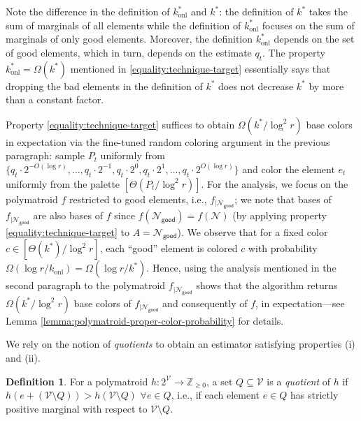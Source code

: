 \documentclass[11pt]{article}
\theoremstyle{definition}
\newtheorem{definition}{Definition}
\newcommand{\calN}{{\mathcal{N}}}
\newcommand{\good}{\mathsf{good}}
\begin{document}
Note the difference in the definition of $k_\text{onl}^*$ and $k^*$: the definition of $k^*$ takes the sum of marginals of all elements while the definition of $k_\text{onl}^*$ focuses on the sum of marginals of only good elements. Moreover, the definition $k_\text{onl}^*$ depends on the set of good elements, which in turn, depends on the estimate $q_t$. 
The property $k_\text{onl}^*=\Omega(k^*)$ mentioned in \eqref{equality:technique-target} essentially says that dropping the bad elements in the definition of $k^*$ does not decrease $k^*$ by more than a constant factor. 
\iffalse
One consequence of property \ref{equality:technique-target} is that (apply the property for $A=\calN_{\good}$)
\begin{align}
    f(\calN_{\good})=f(\calN). 
\end{align} 
\fi
Property \eqref{equality:technique-target} suffices to obtain $\Omega(k^*/\log^2{r})$ base colors in expectation via the fine-tuned random coloring argument in the previous paragraph: sample $P_t$ uniformly from $\{q_t\cdot 2^{-O(\log r)}, \ldots, q_t\cdot 2^{-1}, q_t\cdot 2^0, q_t\cdot 2^{1}, \ldots, q_t\cdot 2^{O(\log r)}\}$ and color the element $e_t$ uniformly from the palette $[\Theta(P_t/\log^2 r)]$. 
For the analysis, we focus on the polymatroid $f$ restricted to good elements, i.e., $f_{|\calN_{\good}}$; we note that bases of $f_{|\calN_{\good}}$ are also bases of $f$ since $f(\calN_{\good})=f(\calN)$ (by applying property \eqref{equality:technique-target} to $A=\calN_{\good}$). 
We observe that for a fixed color $c\in [\Theta(k^*)/\log^2{r}]$, each ``good'' element is colored $c$ with probability $\Omega(\log{r}/k_\text{onl})=\Omega(\log{r}/k^*)$. Hence, using the analysis mentioned in the second paragraph to the polymatroid $f_{|\calN_{\good}}$ shows that the algorithm returns $\Omega(k^*/\log^2{r})$ base colors of $f_{|\calN_{\good}}$ and consequently of $f$, in expectation---see Lemma \ref{lemma:polymatroid-proper-color-probability} for details. 
\fi

We rely on the notion of \emph{quotients} to obtain an estimator satisfying properties (i) and (ii). 
\begin{definition}\label{defn:quotients}
For a polymatroid $h:2^{\mathcal{V}}\rightarrow \mathbb{Z}_{\geq 0}$, a set $Q\subseteq \mathcal{V}$ is a \emph{quotient} of $h$ if $h(e+(\mathcal{V}\setminus Q))>h(\mathcal{V}\setminus Q)$ $\forall e\in Q$, i.e., if each element $e\in Q$ has strictly positive marginal with respect to $\mathcal{V}\setminus Q$. 
\end{definition}
\end{document}
